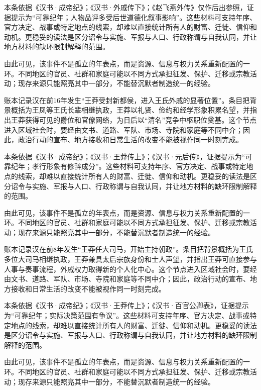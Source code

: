 本条依据《汉书·成帝纪》；《汉书·外戚传下》；《赵飞燕外传》仅作后出参照，证据提示为“可靠纪年；人物品评多受后世道德化叙事影响”。这些材料可支持年序、官方决定、战事或特定地点的线索，却难以直接统计所有人的财富、迁徙、信仰和动机。更稳妥的读法是区分诏令与实施、军报与人口、行政称谓与自我认同，并让地方材料的缺环限制解释的范围。

由此可见，该事件不是孤立的年表点，而是资源、信息与权力关系重新配置的一环。不同地区的官员、社群和家庭可能以不同方式承担征发、保护、迁移或宗教活动；现存来源只能照亮其中一部分，不能替沉默者制造统一的经验。

账本记录汉在前16年发生“王莽受封新都侯，进入王氏外戚的显著位置”。条目把背景概括为王凤等王氏长辈相继执政，王莽以礼贤、俭约和经学形象积累名望，并指出王莽获得可见的爵位和官僚网络，为日后以“清名”竞争中枢职位奠基。这个节点进入区域社会时，要经由文书、道路、军队、市场、寺院和家庭等不同中介；因此，政治行动的宣布、地方接收和日常生活的改变不能被视作同一时刻完成。

本条依据《汉书·成帝纪》；《汉书·王莽传上》；《汉书·元后传》，证据提示为“可靠纪年；孝行形象有修辞成分”。这些材料可支持年序、官方决定、战事或特定地点的线索，却难以直接统计所有人的财富、迁徙、信仰和动机。更稳妥的读法是区分诏令与实施、军报与人口、行政称谓与自我认同，并让地方材料的缺环限制解释的范围。

由此可见，该事件不是孤立的年表点，而是资源、信息与权力关系重新配置的一环。不同地区的官员、社群和家庭可能以不同方式承担征发、保护、迁移或宗教活动；现存来源只能照亮其中一部分，不能替沉默者制造统一的经验。

账本记录汉在前8年发生“王莽任大司马，开始主持朝政”。条目把背景概括为王氏多位大司马相继执政，王莽兼具太后宗族身份和士人声望，并指出王莽可直接参与人事与奏事流程，外戚权力取得新的个人化中心。这个节点进入区域社会时，要经由文书、道路、军队、市场、寺院和家庭等不同中介；因此，政治行动的宣布、地方接收和日常生活的改变不能被视作同一时刻完成。

本条依据《汉书·成帝纪》；《汉书·王莽传上》；《汉书·百官公卿表》，证据提示为“可靠纪年；实际决策范围有争议”。这些材料可支持年序、官方决定、战事或特定地点的线索，却难以直接统计所有人的财富、迁徙、信仰和动机。更稳妥的读法是区分诏令与实施、军报与人口、行政称谓与自我认同，并让地方材料的缺环限制解释的范围。

由此可见，该事件不是孤立的年表点，而是资源、信息与权力关系重新配置的一环。不同地区的官员、社群和家庭可能以不同方式承担征发、保护、迁移或宗教活动；现存来源只能照亮其中一部分，不能替沉默者制造统一的经验。

